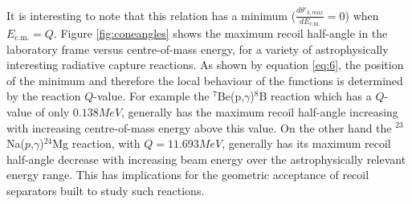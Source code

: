 It is interesting to note that this relation has a minimum ($\frac{d\theta'_{3,max}}{dE_\mathrm{c.m.}}=0$) when $E_\mathrm{c.m.}=Q$. Figure \ref{fig:coneangles} shows the maximum recoil half-angle in the laboratory frame versus centre-of-mass energy, for a variety of astrophysically interesting radiative capture reactions. As shown by equation \ref{eq:6}, the position of the minimum and therefore the local behaviour of the functions is determined by the reaction $Q$-value. For example the $^{7}$Be(p,$\gamma$)$^{8}$B reaction which has a $Q$-value of only $0.138 \unit{MeV}$, generally has the maximum recoil half-angle increasing with increasing centre-of-mass energy above this value. On the other hand the $^{23}$Na($p$,$\gamma$)$^{24}$Mg reaction, with $Q=11.693 \unit{MeV}$, generally has its maximum recoil half-angle decrease with increasing beam energy over the astrophysically relevant energy range. This has implications for the geometric acceptance of recoil separators built to study such reactions. 

